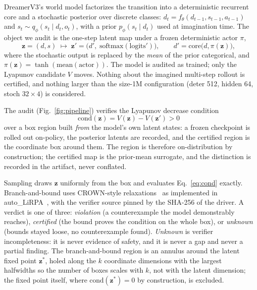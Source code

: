\documentclass[11pt]{article}
\newcommand{\zdyn}{\boldsymbol{z}}
\newcommand{\deter}{d}
\newcommand{\stoch}{s}
\begin{document}
DreamerV3's world model factorizes the transition into a deterministic
recurrent core and a stochastic posterior over discrete
classes: $\deter_t = f_\theta(\deter_{t-1}, \stoch_{t-1}, a_{t-1})$ and
$\stoch_t \sim q_\phi(\stoch_t \mid \deter_t, o_t)$, with a prior
$p_\phi(\stoch_t \mid \deter_t)$ used at imagination time. The object we
audit is the one-step latent map under a frozen deterministic actor
$\pi$,
\begin{equation}
  \label{eq:onestep}
  \zdyn = (\deter, \stoch) \;\mapsto\;
  \zdyn' = \big(\deter',\; \mathrm{softmax}(\mathrm{logits}')\big),
  \qquad \deter' = \mathrm{core}\big(\deter, \pi(\zdyn)\big),
\end{equation}
where the stochastic output is replaced by the \emph{mean} of the prior
categorical, and $\pi(\zdyn) = \tanh(\mathrm{mean}(\mathrm{actor}))$. The
model is audited as trained; only the Lyapunov candidate $V$ moves. Nothing
about the imagined multi-step rollout is certified, and nothing larger than
the size-1M configuration (deter 512, hidden 64, stoch $32\times4$) is
considered.

The audit (Fig.~\ref{fig:pipeline}) verifies the Lyapunov decrease condition
\begin{equation}
  \label{eq:cond}
  \mathrm{cond}(\zdyn) = V(\zdyn) - V(\zdyn') > 0
\end{equation}
over a box region built \emph{from} the model's own latent states: a frozen
checkpoint is rolled out on-policy, the posterior latents are recorded, and
the certified region is the coordinate box around them. The region is
therefore on-distribution by construction; the certified map is the
prior-mean surrogate, and the distinction is recorded in the artifact, never
conflated.

Sampling draws $\zdyn$ uniformly from the box and evaluates
Eq.~\eqref{eq:cond} exactly. Branch-and-bound uses CROWN-style
relaxations~\cite{zhang2018crown} as implemented in
auto\_LiRPA~\cite{xu2020autolirpa}, with the verifier source pinned by the
SHA-256 of the driver. A verdict is one of three: \emph{violation} (a
counterexample the model demonstrably reaches), \emph{certified} (the bound
proves the condition on the whole box), or \emph{unknown} (bounds stayed
loose, no counterexample found). \emph{Unknown} is verifier incompleteness:
it is never evidence of safety, and it is never a gap and never a partial
finding. The branch-and-bound region is an annulus around the latent fixed
point $\zdyn^*$, holed along the $k$ coordinate dimensions with the largest
halfwidths so the number of boxes scales with $k$, not with the latent
dimension; the fixed point itself, where $\mathrm{cond}(\zdyn^*) = 0$ by
construction, is excluded.
\end{document}
